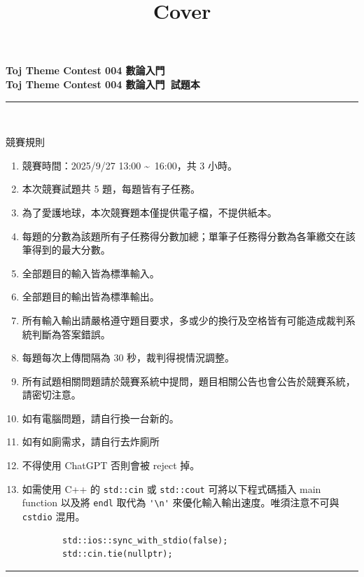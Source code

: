 \documentclass[a4paper]{article}
\title{Cover}
\begin{document}
\begin{center}
\textbf{\huge Toj Theme Contest 004 數論入門}\\
\vspace{5mm}
\textbf{\huge Toj Theme Contest 004 數論入門\ 試題本}\\
\vspace{10mm}
\rule{17cm}{2pt}\\
\vspace{5mm}

\huge 競賽規則\\
\end{center}

\fontsize{14pt}{20pt}\selectfont
\begin{enumerate}
    \setlength\itemsep{0.5pt}
    \item 競賽時間：2025/9/27 13:00 \textasciitilde \, 16:00，共 3 小時。
    \item 本次競賽試題共 5 題，每題皆有子任務。
    \item 為了愛護地球，本次競賽題本僅提供電子檔，不提供紙本。
    \item 每題的分數為該題所有子任務得分數加總；單筆子任務得分數為各筆繳交在該筆得到的最大分數。
    \item 全部題目的輸入皆為標準輸入。
    \item 全部題目的輸出皆為標準輸出。
    \item 所有輸入輸出請嚴格遵守題目要求，多或少的換行及空格皆有可能造成裁判系統判斷為答案錯誤。
    \item 每題每次上傳間隔為 30 秒，裁判得視情況調整。
    \item 所有試題相關問題請於競賽系統中提問，題目相關公告也會公告於競賽系統，請密切注意。
    \item 如有電腦問題，請自行換一台新的。
    \item 如有如廁需求，請自行去炸廁所
    \item 不得使用 ChatGPT 否則會被 reject 掉。
    \item 如需使用 C++ 的 \lstinline{std::cin} 或 \lstinline{std::cout} 可將以下程式碼插入 main function 以及將 \lstinline{endl} 取代為 \lstinline{'\n'} 來優化輸入輸出速度。唯須注意不可與 \lstinline{cstdio} 混用。
        \begin{lstlisting}
        std::ios::sync_with_stdio(false);
        std::cin.tie(nullptr);
        \end{lstlisting}

\end{enumerate}

\begin{center}
\rule{17cm}{2pt}\\
\end{center}
\end{document}
